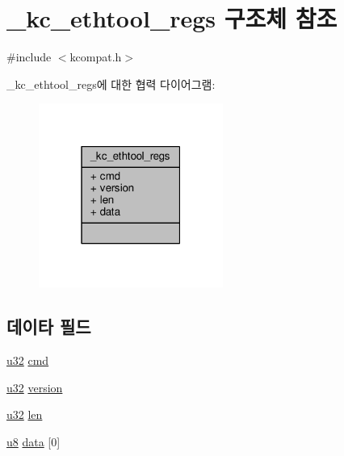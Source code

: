 \hypertarget{struct__kc__ethtool__regs}{}\section{\+\_\+kc\+\_\+ethtool\+\_\+regs 구조체 참조}
\label{struct__kc__ethtool__regs}


{\ttfamily \#include $<$kcompat.\+h$>$}



\+\_\+kc\+\_\+ethtool\+\_\+regs에 대한 협력 다이어그램\+:
\nopagebreak
\begin{figure}[H]
\begin{center}
\leavevmode
\includegraphics[width=171pt]{struct__kc__ethtool__regs__coll__graph}
\end{center}
\end{figure}
\subsection*{데이타 필드}
\begin{DoxyCompactItemize}
\item 
\hyperlink{lib_2igb_2e1000__osdep_8h_a64e91c10a0d8fb627e92932050284264}{u32} \hyperlink{struct__kc__ethtool__regs_a62fe2a1dbf17d5a8561a5a7f5a97a9ba}{cmd}
\item 
\hyperlink{lib_2igb_2e1000__osdep_8h_a64e91c10a0d8fb627e92932050284264}{u32} \hyperlink{struct__kc__ethtool__regs_a27e145a61d04f0b4ff50793581d143a1}{version}
\item 
\hyperlink{lib_2igb_2e1000__osdep_8h_a64e91c10a0d8fb627e92932050284264}{u32} \hyperlink{struct__kc__ethtool__regs_a4105737bcbe35c1fd69996a085d8231a}{len}
\item 
\hyperlink{lib_2igb_2e1000__osdep_8h_a8baca7e76da9e0e11ce3a275dd19130c}{u8} \hyperlink{struct__kc__ethtool__regs_a2873fa0c210cc63894b6cbb14e1a1330}{data} \mbox{[}0\mbox{]}
\end{DoxyCompactItemize}



